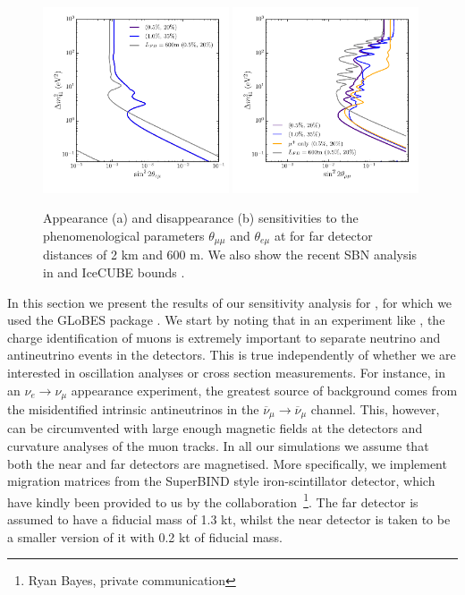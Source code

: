 \begin{figure}
\includegraphics[width=0.49\textwidth]{figs/Comparison_app.pdf}
\includegraphics[width=0.49\textwidth]{figs/Comparison_dis.pdf}
\caption{Appearance (a) and disappearance (b) sensitivities to the phenomenological parameters $\theta_{\mu \mu}$ and $\theta_{e \mu}$ at \nus for far detector distances of 2 km and 600 m. We also show the recent SBN analysis in \cite{Cianci2017} and IceCUBE bounds \cite{TheIceCubeCollaboration2016} \label{fig:3+1comp}.}
\end{figure}
%
In this section we present the results of our sensitivity analysis for \nus, for which we used the GLoBES package \cite{Globes2005}. We start by noting that in an experiment like \nus, the charge identification of muons is extremely important to separate neutrino and antineutrino events in the detectors. This is true independently of whether we are interested in oscillation analyses or cross section measurements. For instance, in an $\nu_{e} \to \nu_{\mu}$ appearance experiment, the greatest source of background comes from the misidentified intrinsic antineutrinos in the $\overline{\nu}_{\mu} \to \overline{\nu}_{\mu}$ channel. This, however, can be circumvented with large enough magnetic fields at the detectors and curvature analyses of the muon tracks. In all our simulations we assume that both the near and far detectors are magnetised. More specifically, we implement migration matrices from the SuperBIND style iron-scintillator detector, which have kindly been provided to us by the collaboration~\footnote{Ryan Bayes, private communication}. The far detector is assumed to have a fiducial mass of 1.3 kt, whilst the near detector is taken to be a smaller version of it with 0.2 kt of fiducial mass.  

